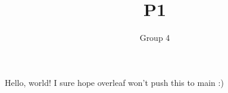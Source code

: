 \documentclass[11pt]{article}
\title{P1}
\author{Group 4}
\begin{document}
    \maketitle

    Hello, world! \cite{how-to}
    I sure hope overleaf won't push this to main :)

    
    
\end{document}
